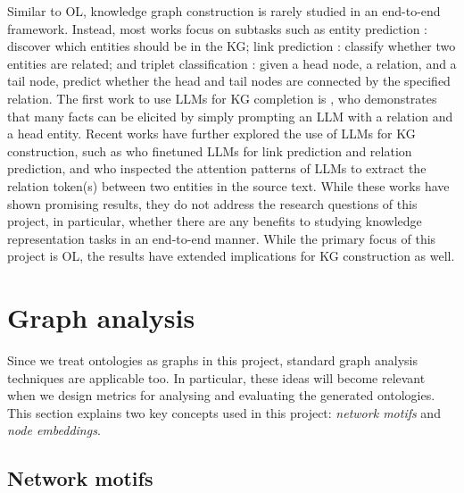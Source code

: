 Similar to OL, knowledge graph construction is rarely studied in an end-to-end framework. Instead, most works focus on subtasks such as entity prediction \cite{lin2015modeling,xie2016representation}: discover which entities should be in the KG; link prediction \cite{liben2003link,trouillon2016complex}: classify whether two entities are related; and triplet classification \cite{lin2015learning,wang2014knowledge}: given a head node, a relation, and a tail node, predict whether the head and tail nodes are connected by the specified relation. The first work to use LLMs for KG completion is \citet{petroni2019language}, who demonstrates that many facts can be elicited by simply prompting an LLM with a relation and a head entity. Recent works have further explored the use of LLMs for KG construction, such as \citet{yao2023exploring} who finetuned LLMs for link prediction and relation prediction, and \citet{wang2020language} who inspected the attention patterns of LLMs to extract the relation token(s) between two entities in the source text. While these works have shown promising results, they do not address the research questions of this project, in particular, whether there are any benefits to studying knowledge representation tasks in an end-to-end manner. While the primary focus of this project is OL, the results have extended implications for KG construction as well.

\section{Graph analysis}  \label{sec:graph}

Since we treat ontologies as graphs in this project, standard graph analysis techniques are applicable too. In particular, these ideas will become relevant when we design metrics for analysing and evaluating the generated ontologies. This section explains two key concepts used in this project: \emph{network motifs} and \emph{node embeddings}.

\subsection{Network motifs}  \label{sec:network-motifs}

